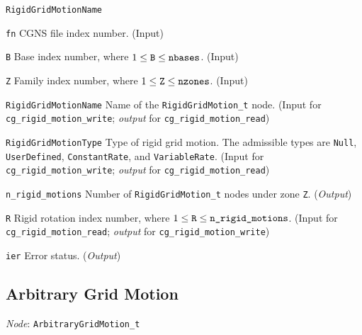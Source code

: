 \begin{Ventryi}{\texttt{RigidGridMotionName}}\raggedright
\item [\texttt{fn}]
      CGNS file index number.
      (\textcolor{input}{Input})
\item [\texttt{B}]
      Base index number, where $1 \leq \text{\texttt{B}} \leq \text{\texttt{nbases}}$.
      (\textcolor{input}{Input})
\item [\texttt{Z}]
      Family index number, where $1 \leq \text{\texttt{Z}} \leq \text{\texttt{nzones}}$.
      (\textcolor{input}{Input})
\item [\texttt{RigidGridMotionName}]
      Name of the \texttt{RigidGridMotion\_t} node.
      (\textcolor{input}{Input} for \texttt{cg\_rigid\_motion\_write};
      \textcolor{output}{\textit{output}} for \texttt{cg\_rigid\_motion\_read})
\item [\texttt{RigidGridMotionType}]
      Type of rigid grid motion.
      The admissible types are \texttt{Null}, \texttt{UserDefined},
      \texttt{ConstantRate}, and \texttt{VariableRate}.
      (\textcolor{input}{Input} for \texttt{cg\_rigid\_motion\_write};
      \textcolor{output}{\textit{output}} for \texttt{cg\_rigid\_motion\_read})
\item [\texttt{n\_rigid\_motions}]
      Number of \texttt{RigidGridMotion\_t} nodes under zone \texttt{Z}.
      (\textcolor{output}{\textit{Output}})
\item [\texttt{R}]
      Rigid rotation index number, where $1 \leq \text{\texttt{R}} \leq \text{\texttt{n\_rigid\_motions}}$.
      (\textcolor{input}{Input} for \texttt{cg\_rigid\_motion\_read};
      \textcolor{output}{\textit{output}} for \texttt{cg\_rigid\_motion\_write})
\item [\texttt{ier}]
      Error status.
      (\textcolor{output}{\textit{Output}})
\end{Ventryi}

\newpage
\subsection{Arbitrary Grid Motion}
\label{s:arbitrary}

\noindent
\textit{Node}: \texttt{ArbitraryGridMotion\_t}

